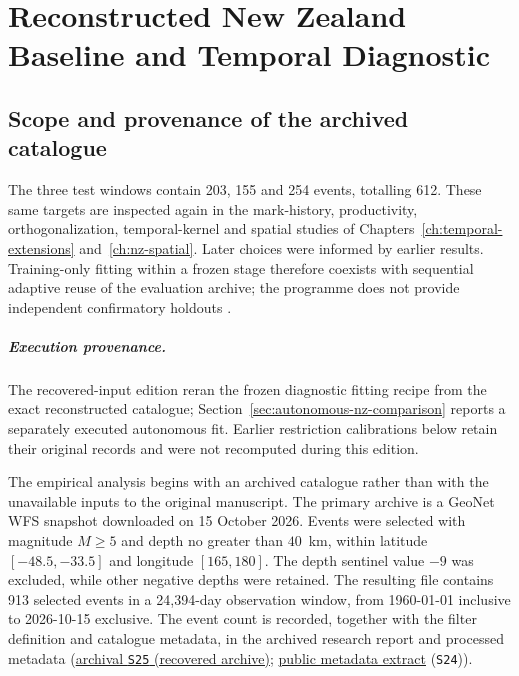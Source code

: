 \chapter{Reconstructed New Zealand Baseline and Temporal Diagnostic}
\label{ch:observed}\label{chap:observed}

\section{Scope and provenance of the archived catalogue}

The three test windows contain 203, 155 and 254 events, totalling 612. These same targets are inspected again in the mark-history, productivity, orthogonalization, temporal-kernel and spatial studies of Chapters~\ref{ch:temporal-extensions} and~\ref{ch:nz-spatial}. Later choices were informed by earlier results. Training-only fitting within a frozen stage therefore coexists with sequential adaptive reuse of the evaluation archive; the programme does not provide independent confirmatory holdouts \citep{Dwork2015}.

\paragraph{Execution provenance.}
The recovered-input edition reran the frozen diagnostic fitting recipe from the exact reconstructed catalogue; Section~\ref{sec:autonomous-nz-comparison} reports a separately executed autonomous fit. Earlier restriction calibrations below retain their original records and were not recomputed during this edition.

The empirical analysis begins with an archived catalogue rather than with the unavailable inputs to the original manuscript. The primary archive is a GeoNet WFS snapshot downloaded on 15 October 2026. Events were selected with magnitude \(M\geq 5\) and depth no greater than \(40\)~km, within latitude \([-48.5,-33.5]\) and longitude \([165,180]\). The depth sentinel value \(-9\) was excluded, while other negative depths were retained. The resulting file contains 913 selected events in a 24,394-day observation window, from 1960-01-01 inclusive to 2026-10-15 exclusive. The event count is recorded, together with the filter definition and catalogue metadata, in the archived research report and processed metadata (\hyperlink{S25}{archival \texttt{S25} (recovered archive)}; \href{https://github.com/Drefetr/An_Evaluation_of_Earthquake_Models/blob/61aa599cd023f2441a6a0c6af9aa4b6fe9eda3e5/provenance/catalogue_snapshot_metadata.json}{public metadata extract} (\texttt{S24})).

